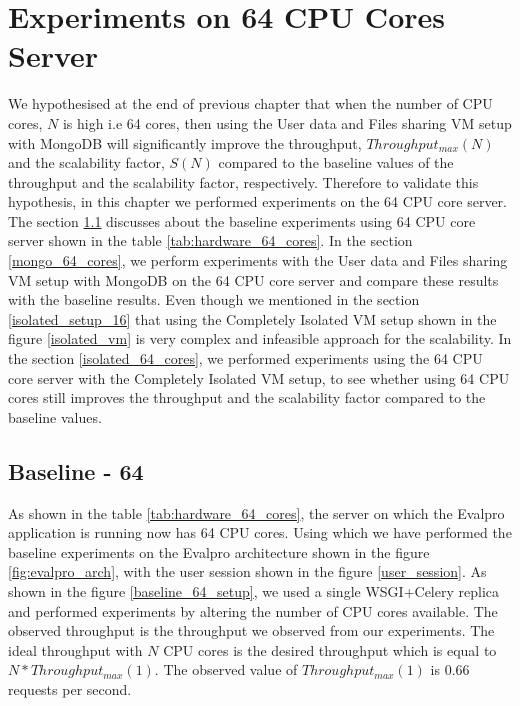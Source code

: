 \documentclass{iitbreport}
\begin{document}
\chapter{Experiments on 64 CPU Cores Server}\label{exp_64}
We hypothesised at the end of previous chapter that when the number of CPU cores, $N$ is high i.e 64 cores, then using the User data and Files sharing VM setup with MongoDB will significantly improve the throughput, $Throughput_{max}(N)$ and the scalability factor, $S(N)$ compared to the baseline values of the throughput and the scalability factor, respectively. Therefore  to validate this hypothesis, in this chapter we performed experiments on the 64 CPU core server.  The section \ref{baseline_64} discusses about the baseline experiments using 64 CPU core server shown in the table \ref{tab:hardware_64_cores}. In the section \ref{mongo_64_cores},  we perform experiments with the User data and Files sharing VM setup with MongoDB on the 64 CPU core server and compare these results with the baseline results. Even though we mentioned in the section \ref{isolated_setup_16} that using the Completely Isolated VM setup shown in the figure \ref{isolated_vm} is very complex and infeasible approach for the scalability. In the section \ref{isolated_64_cores}, we performed experiments using the 64 CPU core server with the Completely Isolated VM setup, to see whether using 64 CPU cores still improves the throughput and the scalability factor compared to the baseline values.

\section{Baseline - 64}\label{baseline_64}
As shown in the table \ref{tab:hardware_64_cores}, the server on which the Evalpro application is running now has 64 CPU cores. Using which we have performed the baseline experiments on the Evalpro architecture shown in the figure \ref{fig:evalpro_arch}, with the user session shown in the figure \ref{user_session}. As shown in the figure \ref{baseline_64_setup}, we used a single WSGI+Celery replica and performed experiments by altering the number of CPU cores available. The observed throughput is the throughput we observed from our experiments. The ideal throughput with $N$ CPU cores is the desired throughput which is equal to $N*Throughput_{max}(1)$. The observed value of $Throughput_{max}(1)$ is 0.66 requests per second.
\end{document}
